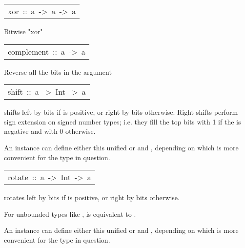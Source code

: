 \begin{haddockdesc}
\begin{haddockdesc}
\end{haddockdesc}
\begin{haddockdesc}
\item[\begin{tabular}{@{}l}
xor\ ::\ a\ ->\ a\ ->\ a
\end{tabular}]\haddockbegindoc
Bitwise "xor"
\par

\end{haddockdesc}
\begin{haddockdesc}
\item[\begin{tabular}{@{}l}
complement\ ::\ a\ ->\ a
\end{tabular}]\haddockbegindoc
Reverse all the bits in the argument 
\par

\end{haddockdesc}
\begin{haddockdesc}
\item[\begin{tabular}{@{}l}
shift\ ::\ a\ ->\ Int\ ->\ a
\end{tabular}]\haddockbegindoc
{} shifts  left by  bits if  is positive,
        or right by  bits otherwise.
        Right shifts perform sign extension on signed number types;
        i.e. they fill the top bits with 1 if the  is negative
        and with 0 otherwise.
\par
An instance can define either this unified  or  and
        , depending on which is more convenient for the type in
        question. 
\par

\end{haddockdesc}
\begin{haddockdesc}
\item[\begin{tabular}{@{}l}
rotate\ ::\ a\ ->\ Int\ ->\ a
\end{tabular}]\haddockbegindoc
{} rotates  left by  bits if  is positive,
        or right by  bits otherwise.
\par
For unbounded types like ,  is equivalent to .
\par
An instance can define either this unified  or  and
        , depending on which is more convenient for the type in
        question. 
\par


\end{haddockdesc}
\end{haddockdesc}
